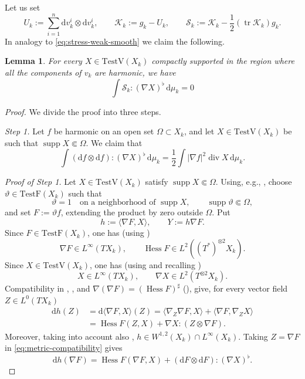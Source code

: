 \documentclass[12pt,a4paper,reqno]{amsart}
\newtheorem{lemma}[theorem]{Lemma}
\newcommand{\TestF}{\mathrm{TestF}}
\newcommand{\TestV}{\mathrm{TestV}}
\newcommand{\Hess}{\operatorname{Hess}}
\newcommand{\supp}{\operatorname{supp}}
\newcommand{\tr}{\operatorname{tr}}
\begin{document}
Let us set
\[
 U_k:=\sum_{i=1}^n \mathrm{d}v_k^i\otimes \mathrm{d}v_k^i,
 \qquad
 \mathcal K_k:=g_k-U_k,
 \qquad
 \mathcal S_k:=\mathcal K_k-\frac12
       (\tr\mathcal K_k)g_k.
\]
In analogy to \eqref{eq:stress-weak-smooth} we claim the following.


\begin{lemma} \label{lem:RCDconserv} For every $X\in\TestV(X_k)$ compactly supported in the region where all
the components of $v_k$ are harmonic, we have
\begin{equation}
 \int\mathcal S_k:(\nabla X)^{\flat}\,\mathrm{d}\mu_k=0
 \label{eq:div-Sk}
\end{equation}
\end{lemma}
\begin{proof}
    We divide the proof into three steps. 
\medskip

\textit{Step 1.}
Let $f$ be harmonic on an open set $\Omega\subset X_k$, and let $X\in\TestV(X_k)$ be such that $\supp X\Subset\Omega$. We claim that
\begin{equation}\label{eq:component-stress-Pre}
 \int(\mathrm{d}f\otimes \mathrm{d}f):(\nabla X)^{\flat}\,\mathrm{d}\mu_k
 =\frac12\int|\nabla f|^2\operatorname{div}X\,\mathrm{d}\mu_k.
\end{equation}

\textit{Proof of Step 1.} Let $X\in\TestV(X_k)$ satisfy
$\supp X\Subset\Omega$. Using, e.g., \cite[Lemma 3.1]{MondinoNaber}, choose $\vartheta\in\TestF(X_k)$ such that
\[
 \vartheta=1\quad\text{on a neighborhood of }\supp X,
 \qquad \supp\vartheta\Subset\Omega,
\]
and set $
 F:=\vartheta f$, 
extending the product by zero outside $\Omega$. Put
\[
 h:=\langle\nabla F,X\rangle,
 \qquad Y:=h\nabla F.
\]
Since $F\in\TestF(X_k)$, one has (using \cite[Theorem 3.3.8]{GigliNDG})
\[
 \nabla F\in L^\infty(TX_k),\qquad
 \Hess F\in L^2((T^*)^{\otimes 2} X_k).
\]
Since $X\in\TestV(X_k)$, one has (using \cite[Theorem 3.4.2(v)]{GigliNDG} and recalling \cite[Definition 3.4.1]{GigliNDG})
\[
 X\in L^\infty(TX_k),\qquad
 \nabla X\in L^2(T^{\otimes 2} X_k).
\]
Compatibility in \cite[Proposition 3.4.6]{GigliNDG}, \cite[Equation (3.4.6)]{GigliNDG}, and
$\nabla(\nabla F)=(\Hess F)^\sharp$ (\cite[Theorem 3.4.2(iv)]{GigliNDG}), give, for every vector field $Z\in L^0(TX_k)$
\begin{equation} \label{eq:metric-compatibility}
\begin{aligned}
 \mathrm{d}h(Z)
 &=\mathrm{d}\langle\nabla F,X\rangle(Z)=\langle\nabla_Z\nabla F,X\rangle
   +\langle\nabla F,\nabla_ZX\rangle\\
   &=\Hess F(Z,X)+\nabla X:(Z\otimes\nabla F).
\end{aligned}
\end{equation}
Moreover, taking into account also \cite[Proposition 3.4.6(i)]{GigliNDG},
$
 h\in W^{1,2}(X_k)\cap L^\infty(X_k)$. 
Taking $Z=\nabla F$ in \eqref{eq:metric-compatibility} gives
\begin{equation}\label{eq:dh-gradF}
 \mathrm{d}h(\nabla F)
 =\Hess F(\nabla F,X)+(\mathrm{d}F\otimes \mathrm{d}F):(\nabla X)^{\flat}.
\end{equation}


\end{proof}
\end{document}
